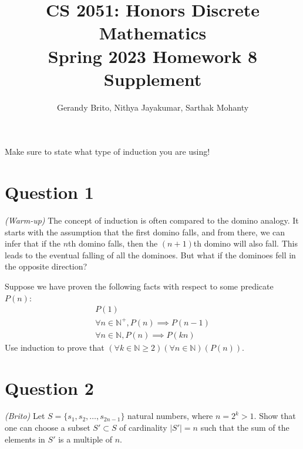 \documentclass{article}
\title{\vspace{-1cm}CS 2051: Honors Discrete Mathematics \\Spring 2023 Homework 8 Supplement}
\author{Gerandy Brito, Nithya Jayakumar, Sarthak Mohanty}
\date{}
\begin{document}
\maketitle

Make sure to state what type of induction you are using!

\section*{Question 1}
    \textit{(Warm-up)} The concept of induction is often compared to the domino analogy. It starts with the assumption that the first domino falls, and from there, we can infer that if the $n$th domino falls, then the $(n + 1)$th domino will also fall. This leads to the eventual falling of all the dominoes. But what if the dominoes fell in the opposite direction? 
    
    \vspace{2mm}
    Suppose we have proven the following facts with respect to some predicate $P(n)$:
    \begin{gather}
        P(1) \\
        \forall n \in \mathbb{N}^{+}, P(n) \implies P(n - 1) \\
        \forall n \in \mathbb{N}, P(n) \implies P(kn)
    \end{gather}
    Use induction to prove that $(\forall k \in \mathbb{N} \ge 2)(\forall n \in \mathbb{N})(P(n))$.

\section*{Question 2 }
    \textit{(Brito)} Let $S=\{s_1,s_2,\ldots, s_{2n-1}\}$ natural numbers, where $n=2^k>1$. Show that one can choose a subset $S'\subset S$ of cardinality $|S'|=n$ such that the sum of the elements in $S'$ is a multiple of $n$.




\end{document}
